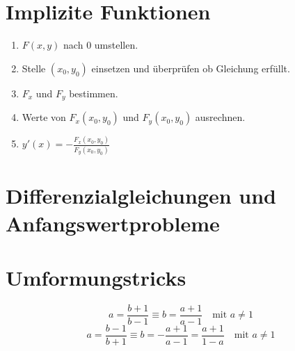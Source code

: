 \documentclass[main.tex]{subfiles}
\begin{document}
\section{Implizite Funktionen}
\renewcommand{\labelenumi}{\arabic{enumi}.}
\begin{enumerate}
    \item $F(x, y)$ nach $0$ umstellen.
    \item Stelle $(x_0, y_0)$ einsetzen und überprüfen ob Gleichung erfüllt.
    \item $F_x$ und $F_y$ bestimmen. 
    \item Werte von $F_x(x_0, y_0)$ und $F_y(x_0, y_0)$ ausrechnen.
    \item $y'(x) = - \frac{F_x(x_0, y_0)}{F_y(x_0, y_0)}$ 
\end{enumerate}


\section{Differenzialgleichungen und Anfangswertprobleme}



\section{Umformungstricks}
\[
	a = \frac{b+1}{b-1} \equiv
	b = \frac{a+1}{a-1}\quad \text{mit } a \neq 1
\]
\[
	a = \frac{b-1}{b+1} \equiv
	b = -\frac{a+1}{a-1} = \frac{a+1}{1-a} \quad \text{mit } a \neq 1
\]
\end{document}
